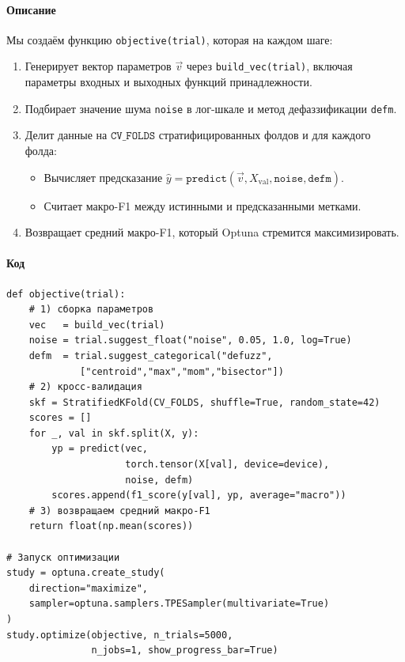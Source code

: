 \paragraph{Описание}  
Мы создаём функцию \texttt{objective(trial)}, которая на каждом шаге:
\begin{enumerate}
  \item Генерирует вектор параметров \(\vec v\) через \texttt{build\_vec(trial)}, включая параметры входных и выходных функций принадлежности.
  \item Подбирает значение шума \texttt{noise} в лог-шкале и метод дефаззификации \texttt{defm}.
  \item Делит данные на \(\texttt{CV\_FOLDS}\) стратифицированных фолдов и для каждого фолда:
    \begin{itemize}
      \item Вычисляет предсказание \(\hat y=\texttt{predict}(\vec v, X_{\text{val}}, \texttt{noise}, \texttt{defm})\).
      \item Считает макро-F1 между истинными и предсказанными метками.
    \end{itemize}
  \item Возвращает средний макро-F1, который Optuna стремится максимизировать.
\end{enumerate}

\paragraph{Код}  
\begin{verbatim}
def objective(trial):
    # 1) сборка параметров
    vec   = build_vec(trial)
    noise = trial.suggest_float("noise", 0.05, 1.0, log=True)
    defm  = trial.suggest_categorical("defuzz",
             ["centroid","max","mom","bisector"])
    # 2) кросс-валидация
    skf = StratifiedKFold(CV_FOLDS, shuffle=True, random_state=42)
    scores = []
    for _, val in skf.split(X, y):
        yp = predict(vec,
                     torch.tensor(X[val], device=device),
                     noise, defm)
        scores.append(f1_score(y[val], yp, average="macro"))
    # 3) возвращаем средний макро-F1
    return float(np.mean(scores))

# Запуск оптимизации
study = optuna.create_study(
    direction="maximize",
    sampler=optuna.samplers.TPESampler(multivariate=True)
)
study.optimize(objective, n_trials=5000,
               n_jobs=1, show_progress_bar=True)
\end{verbatim}

